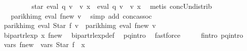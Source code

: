 \begin{isabellebody}
\ \ \ \ \ \ \ \ {\isacharat}{\kern0pt}{\isacharat}{\kern0pt}\ star\ {\isacharparenleft}{\kern0pt}eval\ q\ v\ {\isacharat}{\kern0pt}{\isacharat}{\kern0pt}\ v\ x{\isacharparenright}{\kern0pt}\ {\isacharat}{\kern0pt}{\isacharat}{\kern0pt}\ eval\ q\ v\ {\isacharat}{\kern0pt}{\isacharat}{\kern0pt}\ v\ x{\isacharparenright}{\kern0pt}{\isachardoublequoteclose}\ \isamarkupfalse%
\ {\isacharparenleft}{\kern0pt}metis\ conc{\isacharunderscore}{\kern0pt}Un{\isacharunderscore}{\kern0pt}distrib{\isacharparenleft}{\kern0pt}{}{\isacharparenright}{\kern0pt}{\isacharparenright}{\kern0pt}\isanewline
\ \ \ \ \isamarkupfalse%
\ \isamarkupfalse%
\ {\isachardoublequoteopen}{\isasymdots}\ {\isacharequal}{\kern0pt}\ parikh{\isacharunderscore}{\kern0pt}img\ {\isacharparenleft}{\kern0pt}eval\ {\isacharquery}{\kern0pt}f{\isacharunderscore}{\kern0pt}new\ v{\isacharparenright}{\kern0pt}{\isachardoublequoteclose}\ \isamarkupfalse%
\ {\isacharparenleft}{\kern0pt}simp\ add{\isacharcolon}{\kern0pt}\ conc{\isacharunderscore}{\kern0pt}assoc{\isacharparenright}{\kern0pt}\isanewline
\ \ \ \ \isamarkupfalse%
\ \isamarkupfalse%
\ {\isachardoublequoteopen}parikh{\isacharunderscore}{\kern0pt}img\ {\isacharparenleft}{\kern0pt}eval\ {\isacharparenleft}{\kern0pt}Star\ f{\isacharparenright}{\kern0pt}\ v{\isacharparenright}{\kern0pt}\ {\isacharequal}{\kern0pt}\ parikh{\isacharunderscore}{\kern0pt}img\ {\isacharparenleft}{\kern0pt}eval\ {\isacharquery}{\kern0pt}f{\isacharunderscore}{\kern0pt}new\ v{\isacharparenright}{\kern0pt}{\isachardoublequoteclose}\ \isakeywordONE{{\isachardot}{\kern0pt}}\isamarkupfalse%
\isanewline
\ \ \isamarkupfalse%
\isanewline
\ \ \isamarkupfalse%
\ \isamarkupfalse%
\ {\isachardoublequoteopen}bipart{\isacharunderscore}{\kern0pt}rlexp\ x\ {\isacharquery}{\kern0pt}f{\isacharunderscore}{\kern0pt}new{\isachardoublequoteclose}\ \isamarkupfalse%
\ bipart{\isacharunderscore}{\kern0pt}rlexp{\isacharunderscore}{\kern0pt}def\ \isamarkupfalse%
\ p{\isacharunderscore}{\kern0pt}q{\isacharunderscore}{\kern0pt}intro\ \isamarkupfalse%
\ fastforce\isanewline
\ \ \isamarkupfalse%
\ \isamarkupfalse%
\ f{\isacharprime}{\kern0pt}{\isacharunderscore}{\kern0pt}intro\ p{\isacharunderscore}{\kern0pt}q{\isacharunderscore}{\kern0pt}intro\ \isamarkupfalse%
\ {\isachardoublequoteopen}vars\ {\isacharquery}{\kern0pt}f{\isacharunderscore}{\kern0pt}new\ {\isacharequal}{\kern0pt}\ vars\ {\isacharparenleft}{\kern0pt}Star\ f{\isacharparenright}{\kern0pt}\ {\isasymunion}\ {\isacharbraceleft}{\kern0pt}x{\isacharbraceright}{\kern0pt}{\isachardoublequoteclose}\ \isamarkupfalse%

\end{isabellebody}
